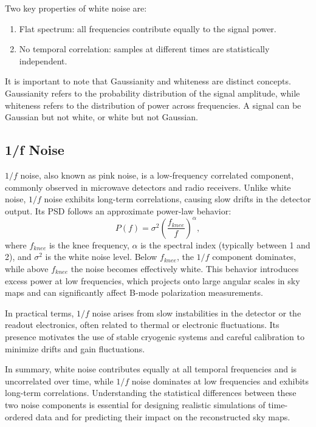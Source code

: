 Two key properties of white noise are:
\begin{enumerate}
    \item Flat spectrum: all frequencies contribute equally to the signal power.
    \item No temporal correlation: samples at different times are statistically independent.
\end{enumerate}

It is important to note that Gaussianity and whiteness are distinct concepts. Gaussianity refers to the probability distribution of the signal amplitude, while whiteness refers to the distribution of power across frequencies. A signal can be Gaussian but not white, or white but not Gaussian.


\subsection{1/f Noise}
$1/f$ noise, also known as pink noise, is a low-frequency correlated component, commonly observed in microwave detectors and radio receivers. Unlike white noise, $1/f$ noise exhibits long-term correlations, causing slow drifts in the detector output. Its PSD follows an approximate power-law behavior:
\begin{equation}
P(f) = \sigma^2 \left(\frac{f_{knee}}{f}\right)^\alpha,
\end{equation}
where $f_{knee}$ is the knee frequency, $\alpha$ is the spectral index (typically between 1 and 2), and $\sigma^2$ is the white noise level. Below $f_{knee}$, the $1/f$ component dominates, while above $f_{knee}$ the noise becomes effectively white. This behavior introduces excess power at low frequencies, which projects onto large angular scales in sky maps and can significantly affect B-mode polarization measurements.

In practical terms, $1/f$ noise arises from slow instabilities in the detector or the readout electronics, often related to thermal or electronic fluctuations. Its presence motivates the use of stable cryogenic systems and careful calibration to minimize drifts and gain fluctuations.

In summary, white noise contributes equally at all temporal frequencies and is uncorrelated over time, while $1/f$ noise dominates at low frequencies and exhibits long-term correlations. Understanding the statistical differences between these two noise components is essential for designing realistic simulations of time-ordered data and for predicting their impact on the reconstructed sky maps.





